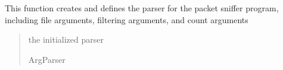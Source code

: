 \documentclass[letterpaper,10pt,english,openany,oneside]{sphinxmanual}
\begin{document}
\begin{fulllineitems}
\label{\detokenize{index:pktsniffer.initialize_parser}}
\pysigstartsignatures
\pysiglinewithargsret
{}
{}
{}
\pysigstopsignatures
\sphinxAtStartPar
This function creates and defines the parser for the packet
sniffer program, including file arguments, filtering arguments,
and count arguments
\begin{quote}\begin{description}
\sphinxAtStartPar
the initialized parser

\sphinxAtStartPar
ArgParser

\end{description}\end{quote}

\end{fulllineitems}




\renewcommand{\indexname}{Index}
\printindex
\end{document}
